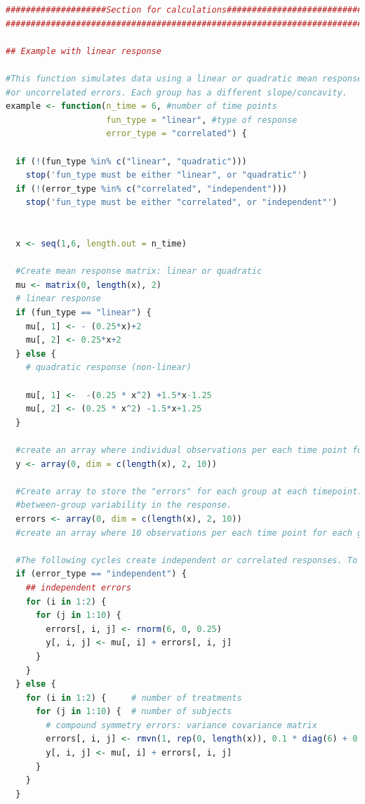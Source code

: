 \documentclass[
]{article}
\begin{document}
\begin{lstlisting}[language=R]
####################Section for calculations######################################
################################################################################

## Example with linear response

#This function simulates data using a linear or quadratic mean response and each with correlated
#or uncorrelated errors. Each group has a different slope/concavity.
example <- function(n_time = 6, #number of time points
                    fun_type = "linear", #type of response
                    error_type = "correlated") {
  
  if (!(fun_type %in% c("linear", "quadratic")))
    stop('fun_type must be either "linear", or "quadratic"')
  if (!(error_type %in% c("correlated", "independent")))
    stop('fun_type must be either "correlated", or "independent"')
  
  
  x <- seq(1,6, length.out = n_time)
  
  #Create mean response matrix: linear or quadratic
  mu <- matrix(0, length(x), 2)
  # linear response
  if (fun_type == "linear") {
    mu[, 1] <- - (0.25*x)+2  
    mu[, 2] <- 0.25*x+2
  } else {
    # quadratic response (non-linear)
    
    mu[, 1] <-  -(0.25 * x^2) +1.5*x-1.25
    mu[, 2] <- (0.25 * x^2) -1.5*x+1.25
  }
  
  #create an array where individual observations per each time point for each group are to be stored. Currently using 10 observations per timepoint
  y <- array(0, dim = c(length(x), 2, 10))
  
  #Create array to store the "errors" for each group at each timepoint. The "errors" are the 
  #between-group variability in the response.
  errors <- array(0, dim = c(length(x), 2, 10))
  #create an array where 10 observations per each time point for each group are to be stored
  
  #The following cycles create independent or correlated responses. To each value of mu (mean response per group) a randomly generated error (correlated or uncorrelated) is added and thus the individual response is created.
  if (error_type == "independent") {
    ## independent errors
    for (i in 1:2) {
      for (j in 1:10) {
        errors[, i, j] <- rnorm(6, 0, 0.25)
        y[, i, j] <- mu[, i] + errors[, i, j]
      }
    }
  } else {
    for (i in 1:2) {     # number of treatments
      for (j in 1:10) {  # number of subjects
        # compound symmetry errors: variance covariance matrix
        errors[, i, j] <- rmvn(1, rep(0, length(x)), 0.1 * diag(6) + 0.25 * matrix(1, 6, 6))
        y[, i, j] <- mu[, i] + errors[, i, j]
      }
    }
  }    
  

\end{lstlisting}
\end{document}
